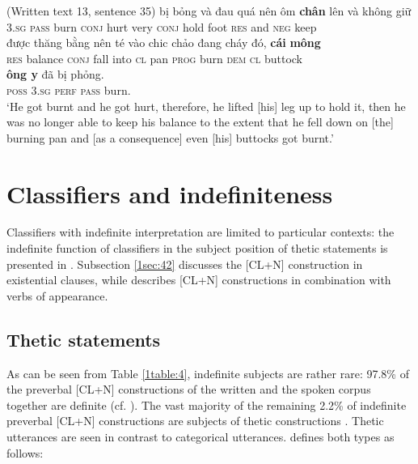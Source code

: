 \documentclass[output=paper]{langsci/langscibook}
\begin{document}
\begin{exe}
\ex\label{1ex:27}
(Written text 13, sentence 35)
\exi{}
  bị        bỏng  và         đau  quá   nên       ôm    {\textbf{chân}}  lên    và   không  giữ  \\
3.{\textsc{sg}}     {\textsc{pass}}  burn   {\textsc{conj}}  hurt  very  {\textsc{conj}}   hold  foot   {\textsc{res}}  and {\textsc{neg}}   keep \\
\glt
\exi{}
\gll được	 {thăng bằng}   nên      té   vào   chi{\dae}c chảo đang    cháy  đó,       {\textbf{cái}}   {\textbf{mông}} \\
{\textsc{res}}  balance          {\textsc{conj}}  fall into   {\textsc{cl}}    pan   {\textsc{prog}} burn   {\textsc{dem}}  {\textsc{cl}}  buttock \\
\exi{}
     {\textbf{ông {\daa}y}}  đã        bị        phỏng. \\
{\textsc{poss}} {\textsc{3.sg}}     {\textsc{perf}}  {\textsc{pass}}  burn.\\
\glt `He got burnt and he got hurt, therefore, he lifted [his] leg up to hold it, then he was no longer able to keep his balance to the extent that he fell down on [the] burning pan and [as a consequence] even [his] buttocks got burnt.'
\end{exe}


\section{Classifiers and indefiniteness}\label{sec:4}

Classifiers with indefinite interpretation are limited to particular contexts: the indefinite function of classifiers in the subject position of thetic statements is presented in . Subsection \ref{1sec:42} discusses the [CL+N] construction in existential clauses, while  describes [CL+N] constructions in combination with verbs of appearance.

\subsection{Thetic statements}\label{1sec:41}

As can be seen from Table \ref{1table:4}, indefinite subjects are rather rare: 97.8\% of the preverbal [CL+N] constructions of the written and the spoken corpus together are definite (cf. ). The vast majority of the remaining 2.2\% of indefinite preverbal [CL+N] constructions are subjects of thetic constructions \citep{kuroda:72,sasse:87,sasse:95}. Thetic utterances are seen in contrast to categorical utterances. \cite{sasse:95} defines both types as follows:\\
\end{document}
